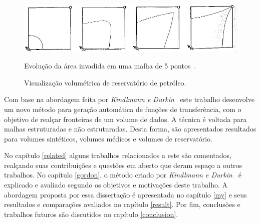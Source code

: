 \begin{figure}[h]
   	\centering
   	\includegraphics[width=1\textwidth]{images/reserv_livro}
   	\label{fig:reserv_livro}
   	\caption{Evolução da área invadida em uma malha de 5 pontos~\cite{rosa}.}
\end{figure}
    
\begin{figure}[h]
	\centering
	\label{fig:reserv}
    \caption{Visualização volumétrica de reservatório de petróleo.}
\end{figure}
    
    Com base na abordagem feita por \textit{Kindlmann e Durkin}~\cite{gordon} este trabalho desenvolve um novo método para geração automática de funções de transferência, com o objetivo de realçar fronteiras de um volume de dados. A técnica é voltada para malhas estruturadas e não estruturadas. Desta forma, são apresentados resultados para volumes sintéticos, volumes médicos e volumes de reservatório.

    No capítulo \ref{related} alguns trabalhos relacionados a este são comentados, realçando suas contribuições e questões em aberto que deram espaço a outros trabalhos. No capítulo \ref{gordon}, o método criado por \textit{Kindlmann e Durkin}~\cite{gordon} é explicado e avaliado segundo os objetivos e motivações deste trabalho. A abordagem proposta por essa dissertação é apresentada no capítulo \ref{my} e seus resultados e comparações avaliados no capítulo \ref{result}. Por fim, conclusões e trabalhos futuros são discutidos no capítulo \ref{conclusion}.